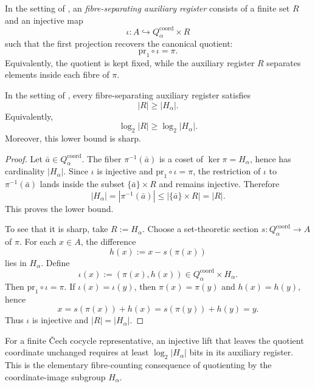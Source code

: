 \begin{definition}\label{def:auxiliary-strictification-code}
In the setting of , an \emph{fibre-separating auxiliary register} consists of a finite set $R$ and an injective map
\[
\iota:A\hookrightarrow Q_{\alpha}^{\mathrm{coord}}\times R
\]
such that the first projection recovers the canonical quotient:
\[
\mathrm{pr}_1\circ\iota=\pi.
\]
Equivalently, the quotient is kept fixed, while the auxiliary register $R$ separates elements inside each fibre of $\pi$.
\end{definition}

\begin{theorem}\label{thm:minimal-information-cost-of-strictification}
In the setting of , every fibre-separating auxiliary register satisfies
\[
|R|\ge |H_\alpha|.
\]
Equivalently,
\[
\log_2 |R|\ge \log_2 |H_\alpha|.
\]
Moreover, this lower bound is sharp.
\end{theorem}

\begin{proof}
Let $\bar a\in Q_{\alpha}^{\mathrm{coord}}$. The fiber $\pi^{-1}(\bar a)$ is a coset of $\ker\pi=H_\alpha$, hence has cardinality $|H_\alpha|$. Since $\iota$ is injective and $\mathrm{pr}_1\circ\iota=\pi$, the restriction of $\iota$ to $\pi^{-1}(\bar a)$ lands inside the subset $\{\bar a\}\times R$ and remains injective. Therefore
\[
|H_\alpha|=|\pi^{-1}(\bar a)|\le |\{\bar a\}\times R|=|R|.
\]
This proves the lower bound.

To see that it is sharp, take $R:=H_\alpha$. Choose a set-theoretic section $s:Q_{\alpha}^{\mathrm{coord}}\to A$ of $\pi$. For each $x\in A$, the difference
\[
h(x):=x-s(\pi(x))
\]
lies in $H_\alpha$. Define
\[
\iota(x):=(\pi(x),h(x))\in Q_{\alpha}^{\mathrm{coord}}\times H_\alpha.
\]
Then $\mathrm{pr}_1\circ\iota=\pi$. If $\iota(x)=\iota(y)$, then $\pi(x)=\pi(y)$ and $h(x)=h(y)$, hence
\[
x=s(\pi(x))+h(x)=s(\pi(y))+h(y)=y.
\]
Thus $\iota$ is injective and $|R|=|H_\alpha|$.
\end{proof}

\begin{corollary}\label{cor:conservative-recovery-budget}
For a finite \v{C}ech cocycle representative, an injective lift that leaves the quotient coordinate unchanged requires at least \(\log_2|H_\alpha|\) bits in its auxiliary register. This is the elementary fibre-counting consequence of quotienting by the coordinate-image subgroup \(H_\alpha\).
\end{corollary}

